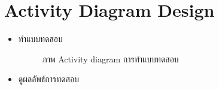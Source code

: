 \documentclass[12pt,oneside,openright,a4paper]{cpe-thai-project}
\begin{document}
\section{Activity Diagram Design}
   \begin{itemize}
    \item ทำแบบทดสอบ
    \begin{figure}[!ht]\centering
      \setlength{\fboxrule}{0.2mm} %
      \setlength{\fboxsep}{1cm}
      \caption{ภาพ Activity diagram การทำแบบทดสอบ}\label{fig:activity1}
     \end{figure}
    \newpage
    \item ดูผลลัพธ์การทดสอบ
    \begin{figure}[!ht]\centering
      \setlength{\fboxrule}{0.2mm} %
      \setlength{\fboxsep}{1cm}

\end{figure}
\end{itemize}
\end{document}
